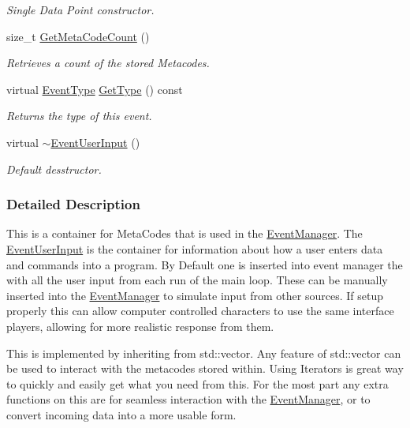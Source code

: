 \begin{DoxyCompactItemize}
\begin{DoxyCompactList}\small\item\em Single Data Point constructor. \item\end{DoxyCompactList}\item 
size\_\-t \hyperlink{classMezzanine_1_1EventUserInput_ae4eaa259b090f4b76a5aad89a7217ea5}{GetMetaCodeCount} ()
\begin{DoxyCompactList}\small\item\em Retrieves a count of the stored Metacodes. \item\end{DoxyCompactList}\item 
virtual \hyperlink{classMezzanine_1_1EventBase_ab85e31e97753b7e7ecb098f82526baef}{EventType} \hyperlink{classMezzanine_1_1EventUserInput_aeb02733446620bd7ff43b449ce5ce98a}{GetType} () const 
\begin{DoxyCompactList}\small\item\em Returns the type of this event. \item\end{DoxyCompactList}\item 
virtual \hyperlink{classMezzanine_1_1EventUserInput_ad5bb99302139d9a69cb2d71ee1784300}{$\sim$EventUserInput} ()
\begin{DoxyCompactList}\small\item\em Default desstructor. \item\end{DoxyCompactList}\end{DoxyCompactItemize}


\subsubsection{Detailed Description}
This is a container for MetaCodes that is used in the \hyperlink{classMezzanine_1_1EventManager}{EventManager}. The \hyperlink{classMezzanine_1_1EventUserInput}{EventUserInput} is the container for information about how a user enters data and commands into a program. By Default one is inserted into event manager the with all the user input from each run of the main loop. These can be manually inserted into the \hyperlink{classMezzanine_1_1EventManager}{EventManager} to simulate input from other sources. If setup properly this can allow computer controlled characters to use the same interface players, allowing for more realistic response from them. \par
 \par
 This is implemented by inheriting from std::vector. Any feature of std::vector can be used to interact with the metacodes stored within. Using Iterators is great way to quickly and easily get what you need from this. For the most part any extra functions on this are for seamless interaction with the \hyperlink{classMezzanine_1_1EventManager}{EventManager}, or to convert incoming data into a more usable form. 

